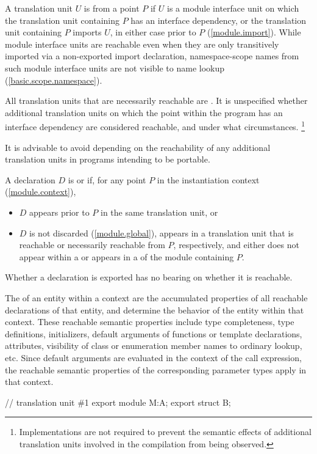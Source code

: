 \begin{std.txt}\color{addclr}
\pnum
A translation unit $U$ is  from a point $P$ if
$U$ is a module interface unit on which the translation unit containing $P$
has an interface dependency, or
the translation unit containing $P$ imports $U$,
in either case prior to $P$ (\ref{module.import}).
\enternote
While module interface units are reachable even when they are only
transitively imported via a non-exported import declaration,
namespace-scope names from such module interface units are not visible
to name lookup (\ref{basic.scope.namespace}).
\exitnote

\pnum
All translation units that are necessarily reachable are .
It is unspecified whether additional translation units on which the
point within the program has an interface dependency are considered reachable,
and under what circumstances.%
\footnote{Implementations are not required to prevent the semantic effects of
additional translation units involved in the compilation from being
observed.}
\begin{note}
It is advisable to avoid
depending on the reachability of any additional translation units
in programs intending to be portable.
\end{note}

\pnum
A declaration $D$ is  or  if,
for any point $P$ in the
instantiation context (\ref{module.context}),
\begin{itemize}
\item $D$ appears prior to $P$ in the same translation unit, or
\item $D$ is not discarded (\ref{module.global}),
appears in a translation unit that is
reachable or necessarily reachable from $P$, respectively,
and
either does not appear within a 
or appears in a 
of the module containing $P$.
\end{itemize}
\enternote
Whether a declaration is exported has no bearing on whether it is reachable.
\exitnote

\pnum
The  of an entity within a context
are the accumulated properties of all reachable declarations of
that entity, and determine the behavior of the entity within
that context.
\enternote
These reachable semantic properties include type completeness,
type definitions, initializers,
default arguments of functions or template declarations, attributes,
visibility of class or enumeration member names to ordinary lookup,
etc.
Since default arguments are evaluated in the context of the call expression,
the reachable semantic properties of the corresponding parameter types apply in
that context.
\begin{example}
\begin{codeblock}
// translation unit \#1
export module M:A;
export struct B;


\end{codeblock}
\end{example}
\end{std.txt}
